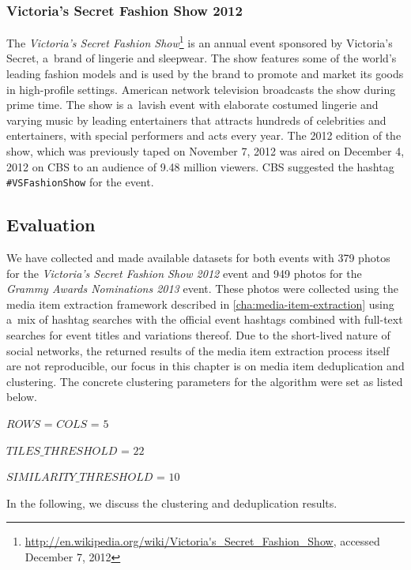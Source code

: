 \subsubsection{Victoria's Secret Fashion Show 2012}

The \emph{Victoria's Secret Fashion
Show}\footnote{\url{http://en.wikipedia.org/wiki/Victoria's_Secret_Fashion_Show},
accessed December 7, 2012} is an annual event
sponsored by Victoria's Secret, a~brand of lingerie and sleepwear.
The show features some of the world's leading fashion models
and is used by the brand to promote and market its goods in high-profile settings.
American network television broadcasts the show during prime time.
The show is a~lavish event with elaborate costumed lingerie and
varying music by leading entertainers
that attracts hundreds of celebrities and entertainers,
with special performers and acts every year.
The 2012 edition of the show,
which was previously taped on November 7, 2012
was aired on December 4, 2012 on CBS
to an audience of 9.48 million viewers.
CBS suggested the hashtag \texttt{\#VSFashionShow} for the event.

\subsection{Evaluation}

We have collected and made available 
datasets for both events with
379 photos for the \emph{Victoria's Secret Fashion Show 2012} event 
and 949 photos for the \emph{Grammy Awards Nominations 2013} event.
These photos were collected using the media item extraction framework
described in \autoref{cha:media-item-extraction}
using a~mix of hashtag searches with the official event hashtags combined
with full-text searches for event titles and variations thereof.
Due to the short-lived nature of social networks,
the returned results of the media item extraction process itself
are not reproducible, our focus in this chapter
is on media item deduplication and clustering.
The concrete clustering parameters for the algorithm were set as listed below.

\begin{small_itemize}
  \item[] $ROWS$ = $COLS$ = $5$
  \item[] $TILES\_THRESHOLD$ = $22$
  \item[] $SIMILARITY\_THRESHOLD$ = $10$
\end{small_itemize}

In the following, we discuss the clustering and deduplication results.

